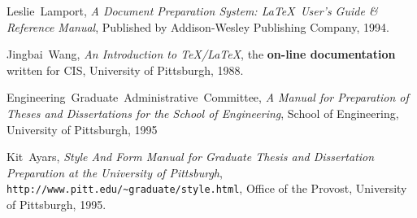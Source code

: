\documentclass [10pt]{pitthesis}
\begin{document}





\begin{thebibliography}{99}

 \mbox{Leslie Lamport}, \emph{A Document Preparation
 System: \LaTeX\ User's Guide \& Reference Manual}, Published by
Addison-Wesley Publishing Company, 1994.

 \mbox{Jingbai Wang}, \emph{An Introduction to
\TeX/\LaTeX}, the \textbf{on-line documentation} written for CIS,
 University of Pittsburgh, 1988.

 \mbox{Engineering Graduate Administrative Committee},
\emph{A Manual for Preparation of Theses and Dissertations
for the School of Engineering}, School of Engineering, University of
Pittsburgh, 1995

 \mbox{Kit Ayars}, \emph{Style And Form Manual for
Graduate Thesis and Dissertation Preparation at the University of Pittsburgh},
\verb|http://www.pitt.edu/~graduate/style.html|,
Office of the Provost, University of Pittsburgh, 1995.


\end{thebibliography}
\end{document}
